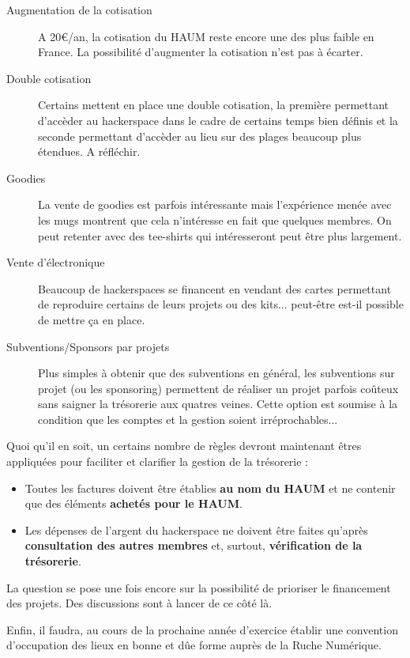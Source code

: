 \documentclass[a4paper, 11pt]{article}
\begin{document}
\begin{description}
	\item[Augmentation de la cotisation] A 20\euro/an, la cotisation du HAUM reste encore une des plus faible en France. La
		possibilité d'augmenter la cotisation n'est pas à écarter.
	\item[Double cotisation] Certains mettent en place une double cotisation, la première permettant d'accèder au
		hackerspace dans le cadre de certains temps bien définis et la seconde permettant d'accèder au lieu sur des
		plages beaucoup plus étendues. A réfléchir.
	\item[Goodies] La vente de goodies est parfois intéressante mais l'expérience menée avec les mugs montrent que cela
		n'intéresse en fait que quelques membres. On peut retenter avec des tee-shirts qui intéresseront peut être plus
		largement.
	\item[Vente d'électronique] Beaucoup de hackerspaces se financent en vendant des cartes permettant de reproduire
		certains de leurs projets ou des kits... peut-être est-il possible de mettre ça en place.
	\item[Subventions/Sponsors par projets] Plus simples à obtenir que des subventions en général, les subventions sur
		projet (ou les sponsoring) permettent de réaliser un projet parfois coûteux sans saigner la trésorerie aux
		quatres veines. Cette option est soumise à la condition que les comptes et la gestion soient
		irréprochables...
\end{description}

Quoi qu'il en soit, un certains nombre de règles devront maintenant êtres appliquées pour faciliter et clarifier la
gestion de la trésorerie :

\begin{itemize}
	\item Toutes les factures doivent être établies \textbf{au nom du HAUM} et ne contenir que des éléments
		\textbf{achetés pour le HAUM}. 
	\item Les dépenses de l'argent du hackerspace ne doivent être faites qu'après \textbf{consultation des autres
		membres} et, surtout, \textbf{vérification de la trésorerie}.
\end{itemize}

La question se pose une fois encore sur la possibilité de prioriser le financement des projets. Des discussions sont à
lancer de ce côté là.

Enfin, il faudra, au cours de la prochaine année d'exercice établir une convention d'occupation des lieux en bonne et dûe
forme auprès de la Ruche Numérique.
\end{document}
